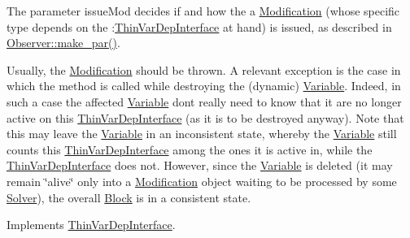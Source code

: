 The parameter issue\+Mod decides if and how the a \mbox{\hyperlink{class_s_m_spp__di__unipi__it_1_1_modification}{Modification}} (whose specific type depends on the \+:\mbox{\hyperlink{class_s_m_spp__di__unipi__it_1_1_thin_var_dep_interface}{Thin\+Var\+Dep\+Interface}} at hand) is issued, as described in \mbox{\hyperlink{class_s_m_spp__di__unipi__it_1_1_observer_a2d499ae38e5e95cf66cd71da32b0694a}{Observer\+::make\+\_\+par()}}.

Usually, the \mbox{\hyperlink{class_s_m_spp__di__unipi__it_1_1_modification}{Modification}} should be thrown. A relevant exception is the case in which the method is called while destroying the (dynamic) \mbox{\hyperlink{class_s_m_spp__di__unipi__it_1_1_variable}{Variable}}. Indeed, in such a case the affected \mbox{\hyperlink{class_s_m_spp__di__unipi__it_1_1_variable}{Variable}} don\textquotesingle{}t really need to know that it are no longer active on this \mbox{\hyperlink{class_s_m_spp__di__unipi__it_1_1_thin_var_dep_interface}{Thin\+Var\+Dep\+Interface}} (as it is to be destroyed anyway). Note that this may leave the \mbox{\hyperlink{class_s_m_spp__di__unipi__it_1_1_variable}{Variable}} in an inconsistent state, whereby the \mbox{\hyperlink{class_s_m_spp__di__unipi__it_1_1_variable}{Variable}} still counts this \mbox{\hyperlink{class_s_m_spp__di__unipi__it_1_1_thin_var_dep_interface}{Thin\+Var\+Dep\+Interface}} among the ones it is active in, while the \mbox{\hyperlink{class_s_m_spp__di__unipi__it_1_1_thin_var_dep_interface}{Thin\+Var\+Dep\+Interface}} does not. However, since the \mbox{\hyperlink{class_s_m_spp__di__unipi__it_1_1_variable}{Variable}} is deleted (it may remain \char`\"{}alive\char`\"{} only into a \mbox{\hyperlink{class_s_m_spp__di__unipi__it_1_1_modification}{Modification}} object waiting to be processed by some \mbox{\hyperlink{class_s_m_spp__di__unipi__it_1_1_solver}{Solver}}), the overall \mbox{\hyperlink{class_s_m_spp__di__unipi__it_1_1_block}{Block}} is in a consistent state. 

Implements \mbox{\hyperlink{group___thin_var_dep_interface___c_l_a_s_s_e_s_gad6726141a0cbe6a0410a2b396809dade}{Thin\+Var\+Dep\+Interface}}.

\mbox{\label{class_s_m_spp__di__unipi__it_1_1_one_var_constraint_a46c11bb15648f9976eee469c53099b11}} 
